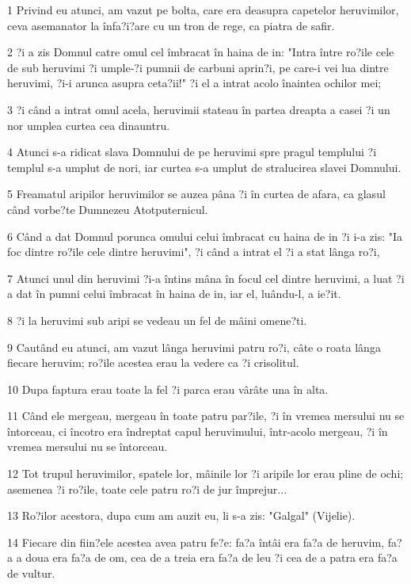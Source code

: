 \par 1 Privind eu atunci, am vazut pe bolta, care era deasupra capetelor heruvimilor, ceva asemanator la înfa?i?are cu un tron de rege, ca piatra de safir.
\par 2 ?i a zis Domnul catre omul cel îmbracat în haina de in: "Intra între ro?ile cele de sub heruvimi ?i umple-?i pumnii de carbuni aprin?i, pe care-i vei lua dintre heruvimi, ?i-i arunca asupra ceta?ii!" ?i el a intrat acolo înaintea ochilor mei;
\par 3 ?i când a intrat omul acela, heruvimii stateau în partea dreapta a casei ?i un nor umplea curtea cea dinauntru.
\par 4 Atunci s-a ridicat slava Domnului de pe heruvimi spre pragul templului ?i templul s-a umplut de nori, iar curtea s-a umplut de stralucirea slavei Domnului.
\par 5 Freamatul aripilor heruvimilor se auzea pâna ?i în curtea de afara, ca glasul când vorbe?te Dumnezeu Atotputernicul.
\par 6 Când a dat Domnul porunca omului celui îmbracat cu haina de in ?i i-a zis: "Ia foc dintre ro?ile cele dintre heruvimi", ?i când a intrat el ?i a stat lânga ro?i,
\par 7 Atunci unul din heruvimi ?i-a întins mâna în focul cel dintre heruvimi, a luat ?i a dat în pumni celui îmbracat în haina de in, iar el, luându-l, a ie?it.
\par 8 ?i la heruvimi sub aripi se vedeau un fel de mâini omene?ti.
\par 9 Cautând eu atunci, am vazut lânga heruvimi patru ro?i, câte o roata lânga fiecare heruvim; ro?ile acestea erau la vedere ca ?i crisolitul.
\par 10 Dupa faptura erau toate la fel ?i parca erau vârâte una în alta.
\par 11 Când ele mergeau, mergeau în toate patru par?ile, ?i în vremea mersului nu se întorceau, ci încotro era îndreptat capul heruvimului, într-acolo mergeau, ?i în vremea mersului nu se întorceau.
\par 12 Tot trupul heruvimilor, spatele lor, mâinile lor ?i aripile lor erau pline de ochi; asemenea ?i ro?ile, toate cele patru ro?i de jur împrejur...
\par 13 Ro?ilor acestora, dupa cum am auzit eu, li s-a zis: "Galgal" (Vijelie).
\par 14 Fiecare din fiin?ele acestea avea patru fe?e: fa?a întâi era fa?a de heruvim, fa?a a doua era fa?a de om, cea de a treia era fa?a de leu ?i cea de a patra era fa?a de vultur.

